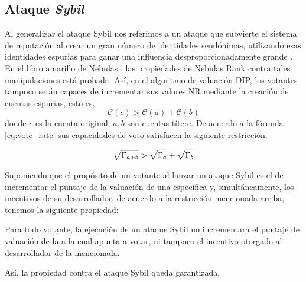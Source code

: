\subsection{Ataque \textit{Sybil}}
\noindent Al generalizar el ataque Sybil nos referimos a un ataque que subvierte el sistema de reputación al crear un gran número de identidades seudónimas, utilizando esas identidades espurias para ganar una influencia desproporcionadamente grande \cite{quercia2010sybil}. En el libro amarillo de Nebulas \cite{Nebulasyellowpaper}, las propiedades de Nebulas Rank contra tales manipulaciones está probada. Así, en el algoritmo de valuación DIP, los votantes tampoco serán capaces de incrementar sus valores NR mediante la creación de cuentas espurias, esto es,
$$\mathcal{C}(c)>\mathcal{C}(a)+\mathcal{C}(b)$$
donde $c$ es la cuenta original, $a,b$ son cuentas títere. De acuerdo a la fórmula \ref{eq:vote_rate} sus capacidades de voto satisfacen la siguiente restricción:

\begin{align}
	\label{eq:sqrt_nr}
	\sqrt{\Gamma_{a+b}}>\sqrt{\Gamma_a}+\sqrt{\Gamma_b}
\end{align}

Suponiendo que el propósito de un votante al lanzar un ataque Sybil es el de incrementar el puntaje de la valuación de una \dapp específica y, simultáneamente, los incentivos de su desarrollador, de acuerdo a la restricción mencionada arriba, tenemos la siguiente propiedad:


\begin{property}
	\label{p3}
    Para todo votante, la ejecución de un ataque Sybil no incrementará el puntaje de valuación de la \dapp a la cual apunta a votar, ni tampoco el incentivo otorgado al desarrollador de la \dapp mencionada.
\end{property}
Así, la propiedad contra el ataque Sybil queda garantizada.